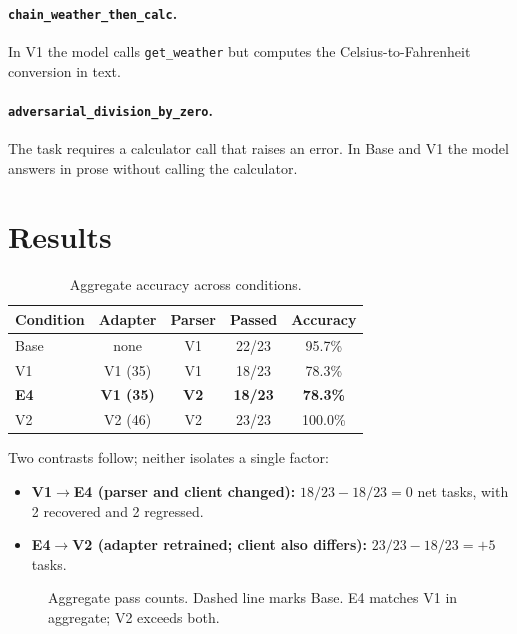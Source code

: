 \documentclass[10pt,twocolumn]{article}
\newcommand{\code}[1]{\texttt{#1}}
\begin{document}
\paragraph{\code{chain\_weather\_then\_calc}.} In V1 the model calls \code{get\_weather} but computes the Celsius-to-Fahrenheit conversion in text.

\paragraph{\code{adversarial\_division\_by\_zero}.} The task requires a calculator call that raises an error. In Base and V1 the model answers in prose without calling the calculator.

\section{Results}

\begin{table}[t]
\centering
\caption{Aggregate accuracy across conditions.}
\label{tab:agg}
\small
\begin{tabular}{lcccc}
\toprule
Condition & Adapter & Parser & Passed & Accuracy \\
\midrule
Base & none & V1 & 22/23 & 95.7\% \\
V1   & V1 (35) & V1 & 18/23 & 78.3\% \\
\textbf{E4} & \textbf{V1 (35)} & \textbf{V2} & \textbf{18/23} & \textbf{78.3\%} \\
V2   & V2 (46) & V2 & 23/23 & 100.0\% \\
\bottomrule
\end{tabular}
\end{table}

Two contrasts follow; neither isolates a single factor:
\begin{itemize}\itemsep2pt
\item \textbf{V1$\to$E4 (parser and client changed):} $18/23 - 18/23 = 0$ net tasks, with 2 recovered and 2 regressed.
\item \textbf{E4$\to$V2 (adapter retrained; client also differs):} $23/23 - 18/23 = +5$ tasks.
\end{itemize}

\begin{figure}[t]
\centering
{}
\caption{Aggregate pass counts. Dashed line marks Base. E4 matches V1 in aggregate; V2 exceeds both.}
\label{fig:results}
\end{figure}
\end{document}
